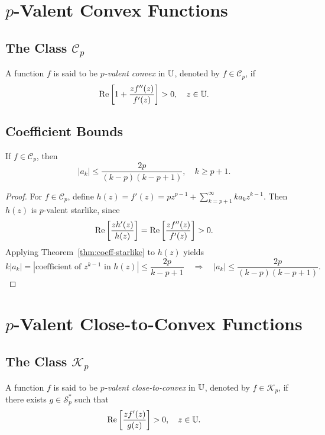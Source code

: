 \section{$p$-Valent Convex Functions}

\subsection{The Class $\mathcal{C}_p$}

\begin{definition}
	A function $f$ is said to be \emph{$p$-valent convex} in $\mathbb{U}$, denoted by $f \in \mathcal{C}_p$, if
	\[
	\operatorname{Re}\left[1 + \frac{z f''(z)}{f'(z)}\right] > 0, \quad z \in \mathbb{U}.
	\]
\end{definition}

\subsection{Coefficient Bounds}

\begin{theorem}\label{thm:coeff-convex}
	If $f \in \mathcal{C}_p$, then
	\[
	|a_k| \le \frac{2p}{(k-p)(k-p+1)}, \quad k \ge p+1.
	\]
\end{theorem}

\begin{proof}
	For $f \in \mathcal{C}_p$, define $h(z) = f'(z) = p z^{p-1} + \sum_{k=p+1}^{\infty} k a_k z^{k-1}$. Then $h(z)$ is $p$-valent starlike, since
	\[
	\operatorname{Re}\left[\frac{z h'(z)}{h(z)}\right] = \operatorname{Re}\left[ \frac{z f''(z)}{f'(z)} \right] > 0.
	\]
	Applying Theorem~\ref{thm:coeff-starlike} to $h(z)$ yields
	\[
	k |a_k| = | \text{coefficient of } z^{k-1} \text{ in } h(z)| \le \frac{2p}{k-p+1} \quad \Rightarrow \quad
	|a_k| \le \frac{2p}{(k-p)(k-p+1)}.
	\]
\end{proof}


\section{$p$-Valent Close-to-Convex Functions}

\subsection{The Class $\mathcal{K}_p$}

\begin{definition}
	A function $f$ is said to be \emph{$p$-valent close-to-convex} in $\mathbb{U}$, denoted by $f \in \mathcal{K}_p$, if there exists $g \in \mathcal{S}_p^*$ such that
	\[
	\operatorname{Re}\left[\frac{z f'(z)}{g(z)}\right] > 0, \quad z \in \mathbb{U}.
	\]
\end{definition}

